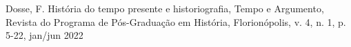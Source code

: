 \documentclass[
12pt,		%
openright,	%
twoside,  %
a4paper,			%
chapter=TITLE,		%
english,			%
french,				%
spanish,			%
brazil				%
]{USPSC-classe/USPSC}
\begin{document}
\begin{flushleft}
\begin{flushleft}
\begin{flushleft}
\begin{flushleft}
[DOSSE, 2012] Dosse, F. Hist\'oria do tempo presente e historiografia, Tempo e Argumento, Revista do Programa de P\'os-Gradua\c{c}\~ao em Hist\'oria, Florion\'opolis, v. 4, n. 1, p. 5-22, jan/jun 2022
\end{flushleft}


\end{flushleft}


\end{flushleft}


\end{flushleft}


\begin{flushleft}
\begin{flushleft}
\begin{flushleft}
\begin{flushleft}

\end{flushleft}


\end{flushleft}


\end{flushleft}


\end{flushleft}


\begin{flushleft}
\begin{flushleft}
\begin{flushleft}
\begin{flushleft}

\end{flushleft}


\end{flushleft}


\end{flushleft}


\end{flushleft}


\begin{flushleft}
\begin{flushleft}
\begin{flushleft}
\begin{flushleft}

\end{flushleft}


\end{flushleft}


\end{flushleft}


\end{flushleft}
\end{document}
